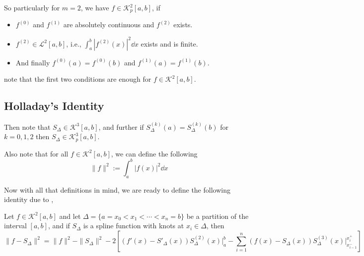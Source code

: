 So particularly for $m = 2$, we have $f \in \mathcal{K}^2_p[a,b]$, if 
\begin{itemize}
    \item $f^{(0)}$ and $f^{(1)}$ are absolutely continuous and $f^{(2)}$ exists. 
    \item $f^{(2)} \in \mathcal{L}^2[a,b]$, i.e., $\int_a^b |f^{(2)}(x)|^2 \dd{x}$ exists and is finite. 
    \item And finally $f^{(0)}(a) = f^{(0)}(b)$ and $f^{(1)}(a) = f^{(1)}(b)$.
\end{itemize}
note that the first two conditions are enough for $f \in \mathcal{K}^2[a,b]$.

\subsection{Holladay's Identity} 

Then note that $S_{\Delta} \in \mathcal{K}^3[a,b]$, and further if $S_{\Delta}^{(k)}(a) = S_{\Delta}^{(k)}(b)$ for $k = 0,1,2$ then $S_{\Delta} \in \mathcal{K}^3_p[a,b]$.

Also note that for all $ f \in \mathcal{K}^2[a,b]$, we can define the following  
\begin{equation}\label{eq3:mar25A}
    \| f \|^2 := \int_a^b |f(x)|^2 \dd{x} 
\end{equation} 

Now with all that definitions in mind, we are ready to define the following identity due to ,
\begin{thm}\label{thm1:mar25A}
    Let $f \in \mathcal{K}^2[a,b]$ and let $\Delta = \{ a = x_0 < x_1 < \cdots < x_n = b \}$ be a partition of the interval $[a,b]$, and if $S_{\Delta}$ is a spline function with knots at $x_i \in \Delta$, then 
    \[
        \| f - S_{\Delta} \|^2 = \| f \|^2 - \| S_{\Delta} \|^2 - 2 \left[ (f'(x) - S'_{\Delta}(x))S^{(2)}_{\Delta}(x) \Big\vert_a^b - \sum_{i=1}^n (f(x) - S_{\Delta}(x)) S^{(3)}_{\Delta}(x) \Big\vert_{x_{i-1}^-}^{x_i^+}  \right]  
    \] 
\end{thm}